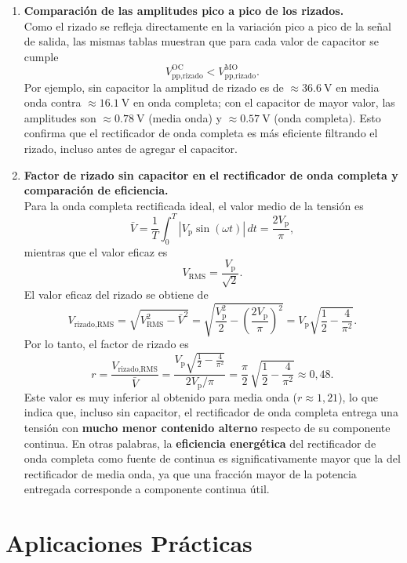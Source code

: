 \documentclass[a4paper,12pt]{article}
\begin{document}
\begin{enumerate}
    \item \textbf{Comparación de las amplitudes pico a pico de los rizados.}\\[4pt]
    Como el rizado se refleja directamente en la variación pico a pico de la señal de salida, las mismas tablas muestran que para cada valor de capacitor se cumple
    \[
        V_{\text{pp,rizado}}^{\text{OC}} < V_{\text{pp,rizado}}^{\text{MO}}.
    \]
    Por ejemplo, sin capacitor la amplitud de rizado es de \(\approx \SI{36,6}{\volt}\) en media onda contra \(\approx \SI{16,1}{\volt}\) en onda completa; con el capacitor de mayor valor, las amplitudes son \(\approx \SI{0,78}{\volt}\) (media onda) y \(\approx \SI{0,57}{\volt}\) (onda completa). Esto confirma que el rectificador de onda completa es más eficiente filtrando el rizado, incluso antes de agregar el capacitor.

    \item \textbf{Factor de rizado sin capacitor en el rectificador de onda completa y comparación de eficiencia.}\\[4pt]
    Para la onda completa rectificada ideal, el valor medio de la tensión es
    \[
        \bar{V} = \frac{1}{T}\int_0^{T} |V_{\text{p}}\sin(\omega t)|\, dt = \frac{2V_{\text{p}}}{\pi},
    \]
    mientras que el valor eficaz es
    \[
        V_{\text{RMS}} = \frac{V_{\text{p}}}{\sqrt{2}}.
    \]
    El valor eficaz del rizado se obtiene de
    \[
        V_{\text{rizado,RMS}} = \sqrt{V_{\text{RMS}}^{2} - \bar{V}^{2}}
        = \sqrt{\frac{V_{\text{p}}^{2}}{2} - \left(\frac{2V_{\text{p}}}{\pi}\right)^{2}}
        = V_{\text{p}} \sqrt{\frac{1}{2} - \frac{4}{\pi^{2}}}.
    \]
    Por lo tanto, el factor de rizado es
    \[
        r = \frac{V_{\text{rizado,RMS}}}{\bar{V}}
          = \frac{V_{\text{p}} \sqrt{\tfrac{1}{2} - \tfrac{4}{\pi^{2}}}}{2V_{\text{p}}/\pi}
          = \frac{\pi}{2}\,\sqrt{\frac{1}{2} - \frac{4}{\pi^{2}}} \approx 0{,}48.
    \]
    Este valor es muy inferior al obtenido para media onda (\(r \approx 1{,}21\)), lo que indica que, incluso sin capacitor, el rectificador de onda completa entrega una tensión con \textbf{mucho menor contenido alterno} respecto de su componente continua. En otras palabras, la \textbf{eficiencia energética} del rectificador de onda completa como fuente de continua es significativamente mayor que la del rectificador de media onda, ya que una fracción mayor de la potencia entregada corresponde a componente continua útil.
\end{enumerate}

\section{Aplicaciones Prácticas}
\end{document}
